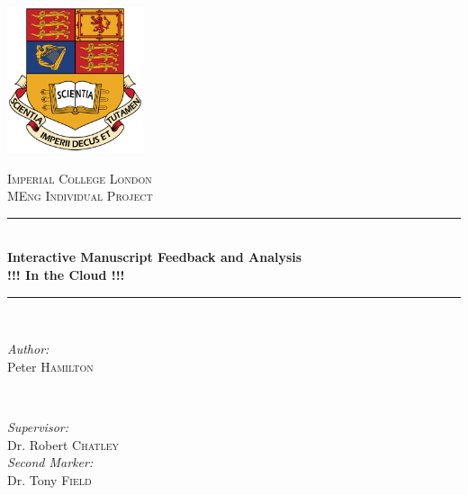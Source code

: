 \begin{titlepage}

\newcommand{\HRule}{\rule{\linewidth}{0.5mm}} %

\begin{center} %


\begin{center}
\includegraphics[width=0.3\textwidth]{gfx/icl-crest.jpg}
\end{center}

\textsc{\LARGE Imperial College London}\\[1.5cm] %
\textsc{\Large MEng Individual Project}\\[0.5cm] %


\HRule \\[0.4cm]
{ \LARGE \bfseries Interactive Manuscript Feedback and Analysis }\\[0.4cm]
{ \large \bfseries !!! In the Cloud !!! }\\[0.3cm]
\HRule \\[1.5cm]


\begin{minipage}{0.4\textwidth}
\begin{flushleft} \large
\emph{Author:}\\
Peter \textsc{Hamilton}
\end{flushleft}
\end{minipage}
~
\begin{minipage}{0.4\textwidth}
\begin{flushright} \large
\emph{Supervisor:} \\
Dr. Robert \textsc{Chatley}
\\[0.4cm]
\emph{Second Marker:} \\
Dr. Tony \textsc{Field}
\end{flushright}
\end{minipage}\\[4cm]


\end{center}
\end{titlepage}
